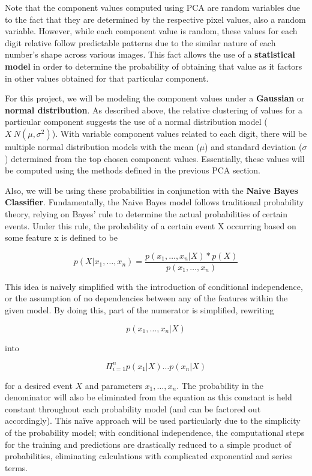 \documentclass[twocolumn]{article}
\begin{document}
Note that the component values computed using PCA are random variables due to the fact that they are determined by the respective pixel values, also a random variable. However, while each component value is random, these values for each digit relative follow predictable patterns due to the similar nature of each number's shape across various images. This fact allows the use of a \textbf{statistical model} in order to determine the probability of obtaining that value as it factors in other values obtained for that particular component. 

For this project, we will be modeling the component values under a \textbf{Gaussian} or \textbf{normal distribution}. As described above, the relative clustering of values for a particular component suggests the use of a normal distribution model ($X ~ N(\mu, \sigma^2)$). With variable component values related to each digit, there will be multiple normal distribution models with the mean ($\mu$) and standard deviation ($\sigma$) determined from the top chosen component values. Essentially, these values will be computed using the methods defined in the previous PCA section. 

Also, we will be using these probabilities in conjunction with the \textbf{Naive Bayes Classifier}. Fundamentally, the Naive Bayes model follows traditional probability theory, relying on Bayes' rule to determine the actual probabilities of certain events. Under this rule, the probability of a certain event X occurring based on some feature x is defined to be

$$p(X | x_1, \ldots, x_n) = \frac{p(x_1, \ldots, x_n | X) * p(X)}{p(x_1, \ldots, x_n)}$$

This idea is naively simplified with the introduction of conditional independence, or the assumption of no dependencies between any of the features within the given model. By doing this, part of the numerator is simplified, rewriting

$$p( x_1, \ldots, x_n | X) $$

into

$$\Pi_{i=1}^{n}p(x_1 | X)\ldots p(x_n | X)$$

for a desired event $X$ and parameters $x_1,\ldots, x_n$. The probability in the denominator will also be eliminated from the equation as this constant is held constant throughout each probability model (and can be factored out accordingly). This naïve approach will be used particularly due to the simplicity of the probability model; with conditional independence, the computational steps for the training and predictions are drastically reduced to a simple product of probabilities, eliminating calculations with complicated exponential and series terms.
\end{document}
